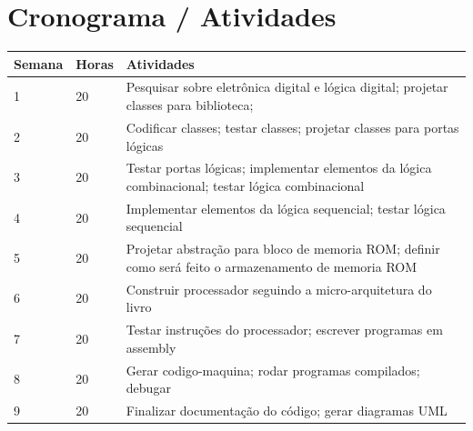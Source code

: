 \documentclass[12pt]{report}
\begin{document}
\chapter{Cronograma / Atividades}
\begin{center}
\begin{tabular}{llp{}}
  Semana & Horas & Atividades\\ \hline \vspace{5pt}
  1 & 20 & Pesquisar sobre eletrônica digital e lógica digital; projetar classes para biblioteca;\\\vspace{5pt}
2 & 20 & Codificar classes; testar classes; projetar classes para portas lógicas\\\vspace{5pt}
3 & 20 & Testar portas lógicas; implementar elementos da lógica combinacional; testar lógica combinacional\\\vspace{5pt}
4 & 20 & Implementar elementos da lógica sequencial; testar lógica sequencial\\\vspace{5pt}
5 & 20 & Projetar abstração para bloco de memoria ROM; definir como será feito o armazenamento de memoria ROM\\\vspace{5pt}
6 & 20 & Construir processador seguindo a micro-arquitetura do livro\\\vspace{5pt}
7 & 20 & Testar instruções do processador; escrever programas em assembly\\\vspace{5pt}
8 & 20 & Gerar codigo-maquina; rodar programas compilados; debugar\\\vspace{5pt}
9 & 20 & Finalizar documentação do código; gerar diagramas UML\\\hline
\end{tabular}
\end{center}

\printbibliography
\end{document}
